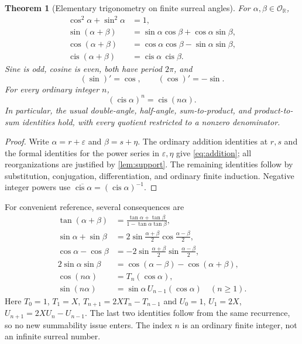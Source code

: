 \documentclass[11pt]{article}
\numberwithin{equation}{section}
\newtheorem{theorem}{Theorem}[section]
\theoremstyle{definition}
\newcommand{\R}{\mathbb R}
\newcommand{\OO}{\mathcal O}
\newcommand{\eps}{\varepsilon}
\newcommand{\cis}{\operatorname{cis}}
\begin{document}
\begin{theorem}[Elementary trigonometry on finite surreal angles]\label{thm:identities}
For $\alpha,\beta\in\OO_{\R}$,
\begin{align}
 \cos^2\alpha+\sin^2\alpha&=1,\\
 \sin(\alpha+\beta)&=\sin\alpha\cos\beta+\cos\alpha\sin\beta,\\
 \cos(\alpha+\beta)&=\cos\alpha\cos\beta-\sin\alpha\sin\beta,\\
 \cis(\alpha+\beta)&=\cis\alpha\,\cis\beta.
 \label{eq:addition}
\end{align}
Sine is odd, cosine is even, both have period $2\pi$, and
\[
 (\sin)'=\cos,\qquad (\cos)'=-\sin.
\]
For every ordinary integer $n$,
\begin{equation}\label{eq:demoivre}
 (\cis\alpha)^n=\cis(n\alpha).
\end{equation}
In particular, the usual double-angle, half-angle, sum-to-product, and product-to-sum identities hold, with every quotient restricted to a nonzero denominator.
\end{theorem}
\begin{proof}
Write $\alpha=r+\eps$ and $\beta=s+\eta$. The ordinary addition identities at $r,s$ and the formal identities for the power series in $\eps,\eta$ give \eqref{eq:addition}; all reorganizations are justified by \cref{lem:support}. The remaining identities follow by substitution, conjugation, differentiation, and ordinary finite induction. Negative integer powers use $\overline{\cis\alpha}=(\cis\alpha)^{-1}$.
\end{proof}

For convenient reference, several consequences are
\begin{align}
 \tan(\alpha+\beta)&=\frac{\tan\alpha+\tan\beta}{1-\tan\alpha\tan\beta},\\
 \sin\alpha+\sin\beta&=2\sin\frac{\alpha+\beta}{2}\cos\frac{\alpha-\beta}{2},\\
 \cos\alpha-\cos\beta&=-2\sin\frac{\alpha+\beta}{2}\sin\frac{\alpha-\beta}{2},\\
 2\sin\alpha\sin\beta&=\cos(\alpha-\beta)-\cos(\alpha+\beta),\\
 \cos(n\alpha)&=T_n(\cos\alpha),\\
 \sin(n\alpha)&=\sin\alpha\,U_{n-1}(\cos\alpha)\quad(n\ge1).
 \label{eq:chebyshev}
\end{align}
Here $T_0=1$, $T_1=X$, $T_{n+1}=2XT_n-T_{n-1}$ and $U_0=1$, $U_1=2X$, $U_{n+1}=2XU_n-U_{n-1}$. The last two identities follow from the same recurrence, so no new summability issue enters. The index $n$ is an ordinary finite integer, not an infinite surreal number.
\end{document}
